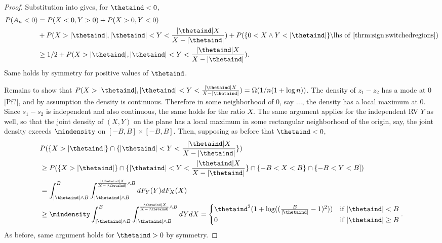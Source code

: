 \documentclass[12pt]{article}
\renewcommand{\P}{P}
\newcommand{\bnd}{B}
\newcommand{\A}{A}
\newcommand{\y}{Y}
\newcommand{\x}{X}
\begin{document}
{\begin{proof}
      Substitution into  gives, for $\thetaind<0$,
      \begin{align}
        \P(\A_n<0) &= \P(\x<0,\y>0) + \P(\x>0,\y<0)\\
                   &+ \P(\x>|\thetaind|,|\thetaind|<\y<\frac{|\thetaind|\x}{\x-|\thetaind|}) + \P(\{0 < \x\wedge\y < |\thetaind|\} \backslash \text{lhs of \refeq{thrm:sign:switchedregions}})\\
                   &\ge 1/2 +  \P(\x>|\thetaind|,|\thetaind|<\y<\frac{|\thetaind|\x}{\x-|\thetaind|}).
      \end{align}
      Same holds by symmetry for positive values of $\thetaind$.
      
      Remains to show that
      $\P(\x>|\thetaind|,|\thetaind|<\y<\frac{|\thetaind|\x}{\x-|\thetaind|})=\Omega(1/n(1+\log
      n))$. The density of $z_1-z_2$ has a mode at $0$ [Pf?], and by
      assumption the density is continuous. Therefore in some
      neighborhood of $0$, say ..., the density has a local maximum at
      $0$. Since $s_1-s_2$ is independent and also continuous, the
      same holds for the ratio $\x$. The same argument applies for the
      independent RV $\y$ as well, so that the joint density of
      $(\x,\y)$ on the plane has a local maximum in some rectangular
      neighborhood of the origin, say, the joint density exceeds
      $\mindensity$ on $[-\bnd,\bnd]\times[-\bnd,\bnd]$. Then,
      supposing as before that $\thetaind<0$,
      \begin{align}
        &\P(\{\x>|\thetaind|\}\cap\{|\thetaind|<\y<\frac{|\thetaind|\x}{\x-|\thetaind|}\} )\\
        &\ge \P(\{\x>|\thetaind|\}\cap\{|\thetaind|<\y<\frac{|\thetaind|\x}{\x-|\thetaind|}\} \cap \{-\bnd<\x<\bnd\}\cap\{-\bnd<\y<\bnd])\\
        &=\int_{|\thetaind|\wedge\bnd}^{\bnd}\int_{|\thetaind|\wedge\bnd}^{\frac{|\thetaind|\x}{\x-|\thetaind|}\wedge\bnd}dF_{\y}(\y)dF_{\x}(\x)\\
        &\ge\mindensity\int_{|\thetaind|\wedge\bnd}^{\bnd}\int_{|\thetaind|\wedge\bnd}^{\frac{|\thetaind|\x}{\x-|\thetaind|}\wedge\bnd}d\y d\x
          =\begin{cases}
            \thetaind^2(1+\log((\frac{\bnd}{|\thetaind|}-1)^2)) &\mbox{if } |\thetaind| < \bnd \\
            0 & \mbox{if } |\thetaind| \ge \bnd
          \end{cases} .
      \end{align}
      As before, same argument holds for $\thetaind>0$ by symmetry. 


\end{proof}}
\end{document}

